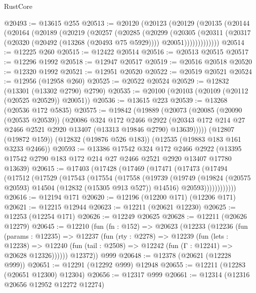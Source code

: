 \begin{lexlean}{RustCore}
\begin{coremodule}
@20493 := @13615 @255
@20513 := @20120
    (@20123
      (@20129
        (@20135
          (@20144
            (@20164
              (@20189
                (@20219
                  (@20257
                    (@20285
                      (@20299
                        (@20305
                          (@20311
                            (@20317
                              (@20320 (@20492 (@13268 (@20493 @75 @5929))))
                              @20051)))))))))))))
@20514 := @12225 @260
@20515 := @12422 @20514
@20516 := @20513 @20515
@20517 := @12296 @1992
@20518 := @12947 @20517
@20519 := @20516 @20518
@20520 := @12320 @1992
@20521 := @12951 @20520
@20522 := @20519 @20521
@20524 := @12956 (@12958 @260)
@20525 := @20522 @20524
@20529 := @12832 (@13301 (@13302 @2790) @2790)
@20535 := @20100 (@20103 (@20109 (@20112 (@20525 @20529)) @20051))
@20536 := @13615 @223
@20539 := @13268 (@20536 @172 @5835)
@20575 := @19842
    (@19889
      (@20073
        (@20085
          (@20090 (@20535 @20539))
          (@20086
            @324
            @172
            @2466
            @2922
            (@20343 @172 @214 @27 @2466 @2521 @2920 @13407 (@13313 @19846 @2790) @13639)))))
    (@12807 (@19872 @159))
    (@12832 (@19876 @526 @183))
    (@12535 (@19883 @183 @161 @3233 @2466))
@20593 := @13386
    @17542
    @324
    @172
    @2466
    @2922
    (@13395 @17542 @2790 @183 @172 @214 @27 @2466 @2521 @2920 @13407 @17780 @13639)
@20615 := @17403
    (@17428
      (@17469
        (@17471
          (@17473
            (@17494
              (@17512
                (@17529
                  (@17543
                    (@17554
                      (@17558
                        (@19739
                          (@19749
                            (@19824 (@20575 @20593) @14504 (@12832 (@15305 @913 @527)) @14516)
                            @20593))))))))))))
@20616 := @12194 @171
@20620 := @12196 (@12200 @171) (@12206 @171)
@20621 := @12215 @12944
@20623 := @12211 (@20621 @12230)
@20625 := @12253 (@12254 @171)
@20626 := @12249 @20625
@20628 := @12211 (@20626 @12279)
@20645 := @12210
    (fun (fn : @152) =>
    @20623
      (@12233
        (@12236
          (fun (params : @12235) =>
          @12237
            (fun (rty : @2278) =>
            @12239
              (fun (lets : @12238) =>
              @12240 (fun (tail : @2508) => @12242 (fun (Γ : @12241) => @20628 @12326))))))
        @12372))
    @999
@20648 := @12378 (@20621 (@12228 @999))
@20651 := @12291 (@12292 @999) @12948
@20655 := @12211 (@12283 (@20651 @12300) @12304)
@20656 := @12317 @999
@20661 := @12314 (@12316 @20656 @12952 @12272 @12274)

\end{coremodule}
\end{lexlean}
